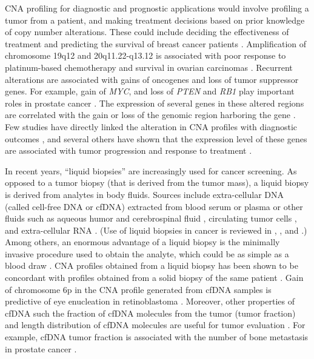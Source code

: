 CNA profiling for diagnostic and prognostic applications would involve
profiling a tumor from a patient, and making treatment decisions based
on prior knowledge of copy number alterations.
%
These could include deciding the effectiveness of treatment and
predicting the survival of breast cancer patients
\citep{stuart2009linking,hicks2006novel}.
Amplification of chromosome 19q12 and 20q11.22-q13.12 is associated with
poor response to platinum-based chemotherapy and survival in ovarian
carcinomas \citep{etemadmoghadam2009integrated}.
%
Recurrent alterations are associated with gains of oncogenes and loss of
tumor suppressor genes. For example, gain of \emph{MYC}, and loss of
\emph{PTEN} and \emph{RB1} play important roles in prostate cancer
\citep{alexander2018utility}.
%
The expression of several genes in these altered regions are correlated
with the gain or loss of the genomic region harboring the gene
\citep{pollack2002microarray,chitale2009integrated,lu2011integrated}.
%
Few studies have directly linked the alteration in CNA profiles with
diagnostic outcomes \citep{etemadmoghadam2009integrated,
bardelli2013amplification,berry2018genomic}, and several others have
shown that the expression level of these genes are associated with tumor
progression and response to treatment \citep{shattuck2008met,
gorre2001clinical,villanueva2013concurrent}.

In recent years, ``liquid biopsies'' are increasingly used for
cancer screening. As opposed to a tumor biopsy (that is derived from the
tumor mass), a liquid biopsy is derived from analytes in body fluids.
Sources include extra-cellular DNA (called cell-free DNA or cfDNA)
extracted from blood serum or plasma
\citep{leary2012detection,chan2013cancer,li2017cell} or other fluids
such as aqueous humor \citep{berry2017potential} and cerebrospinal fluid
\citep{mouliere2018detection}, circulating tumor cells
\citep{dago2014rapid}, and extra-cellular RNA
\citep{zaporozhchenko2018potential}.  (Use of liquid biopsies in cancer
is reviewed in \cite{heitzer2019current} , \cite{crowley2013liquid},
and \cite{schwarzenbach2011cell}.)
%
Among others, an enormous advantage of a liquid biopsy is the minimally
invasive procedure used to obtain the analyte, which could be as simple
as a blood draw \citep{heitzer2019current}.
%
CNA profiles obtained from a liquid biopsy has been shown to be
concordant with profiles obtained from a solid biopsy of the same
patient \citep{chan2013cancer,berry2017potential}.
%
Gain of chromosome 6p in the CNA profile generated from cfDNA samples is
predictive of eye enucleation in retinoblastoma
\citep{berry2018genomic}.
%
Moreover, other properties of cfDNA such the fraction of cfDNA molecules
from the tumor (tumor fraction) and length distribution of cfDNA
molecules are useful for tumor evaluation \citep{choudhury2018tumor,
mouliere2018enhanced,underhill2016fragment,cristiano2019genome}.  For
example, cfDNA tumor fraction is associated with the number of bone
metastasis in prostate cancer \citep{choudhury2018tumor}.


